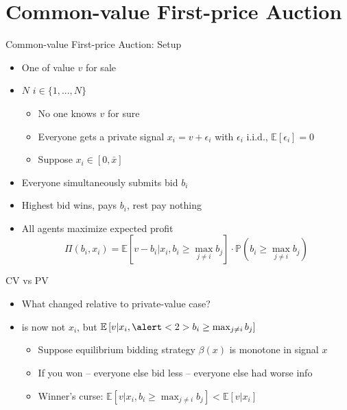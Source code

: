 \documentclass[english,10pt
,aspectratio=169
]{beamer}
\begin{document}
\section{Common-value First-price Auction}

\begin{frame}{Common-value First-price Auction: Setup}
	\begin{itemize}
		\item One  of \alert{value $v$} for sale
		\item $N$  $i \in \{1,...,N\}$
		\begin{itemize}
			\item No one knows $v$ for sure
			\item Everyone gets a private signal $x_i = v+\epsilon_i$ with $\epsilon_i$ i.i.d., $\mathbb{E}[\epsilon_i]=0$
			\item Suppose $x_i \in [0,\bar{x}]$
		\end{itemize}
		\item Everyone simultaneously submits bid $b_i$
		\item Highest bid wins, pays $b_i$, rest pay nothing
		\item All agents maximize expected profit
		\[ 
			\Pi(b_i,x_i) = \mathbb{E} \left[ v - b_i | x_i, b_i \geq \max_{j\neq i} b_j \right] \cdot \mathbb{P} \left( b_i \geq \max_{j\neq i} b_j \right) 
		\]
	\end{itemize}
\end{frame}


\begin{frame}{CV vs PV}
	\begin{itemize}
		\item What changed relative to private-value case?
		\item {} is now not $x_i$, but $\mathbb{E} \left[ v | x_i, \alert<2>{b_i \geq \max_{j\neq i} b_j} \right]$
		\pause
		\begin{itemize}
			\item Suppose equilibrium bidding strategy $\beta(x)$ is monotone in signal $x$
			\item If you won -- everyone else bid less -- everyone else had worse info
			\item \alert{Winner's curse}: $\mathbb{E} \left[ v | x_i, b_i \geq \max_{j\neq i} b_j \right] < \mathbb{E} \left[ v | x_i \right]$
		\end{itemize}
	\end{itemize}
\end{frame}
\end{document}
